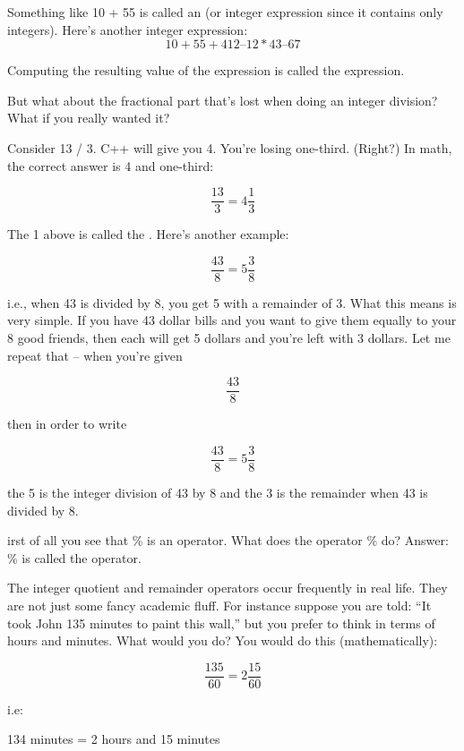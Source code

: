 %

Something like 10 + 55 is called an  (or integer
expression since it contains only integers). Here's another integer
expression:
\[ 10 + 55 + 412 – 12 * 43 – 67\]

Computing the resulting value of the expression is called
 the expression.

But what about the fractional part that's lost when doing an integer
division? What if you really wanted it?

Consider 13 / 3. C++ will give you 4. You're losing one-third. (Right?) In
math, the correct answer is 4 and one-third:

\[\frac{13}{3} = 4\frac{1}{3}\]

The 1 above is called the . Here's another example:

\[\frac{43}{8} = 5\frac{3}{8}\]

i.e., when 43 is divided by 8, you get 5 with a remainder of 3. What this
means is very simple. If you have 43 dollar bills and you want to give
them equally to your 8 good friends, then each will get 5 dollars and
you're left with 3 dollars. Let me repeat that – when you're given

\[\frac{43}{8}\]

then in order to write

\[\frac{43}{8} = 5\frac{3}{8}\]

the 5 is the integer division of 43 by 8 and the 3 is the remainder when
43 is divided by 8.

%

irst of all you see that \% is an operator. What does the operator \% do?
Answer: 
\% is called the  operator.

%

The integer quotient and remainder operators occur frequently in real life.
They are not just some fancy academic fluff. For instance suppose you
are told: “It took John 135 minutes to paint this wall,” but you prefer to
think in terms of hours and minutes. What would you do? You would do
this (mathematically):

\[\frac{135}{60} = 2\frac{15}{60}\]

i.e:

\begin{center}
  134 minutes = 2 hours and 15 minutes
\end{center}

